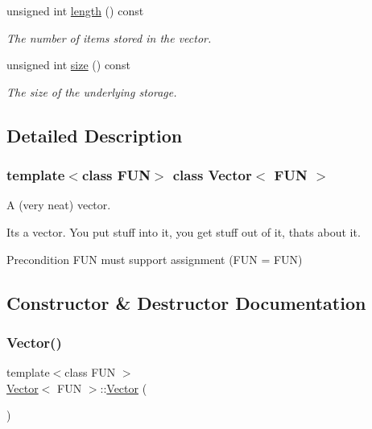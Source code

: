 \begin{DoxyCompactItemize}
unsigned int \hyperlink{classVector_ab89f11fa1d0aadc25484f4971f16f38a}{length} () const
\begin{DoxyCompactList}\small\item\em The number of items stored in the vector. \end{DoxyCompactList}\item 
unsigned int \hyperlink{classVector_a21b80c989eadd6dfa49f2c01e53abd35}{size} () const
\begin{DoxyCompactList}\small\item\em The size of the underlying storage. \end{DoxyCompactList}\end{DoxyCompactItemize}


\subsection{Detailed Description}
\subsubsection*{template$<$class F\+UN$>$\newline
class Vector$<$ F\+U\+N $>$}

A (very neat) vector. 

It\textquotesingle{}s a vector. You put stuff into it, you get stuff out of it, that\textquotesingle{}s about it.

\begin{DoxyPrecond}{Precondition}
F\+UN must support assignment (F\+UN = F\+UN) 
\end{DoxyPrecond}


\subsection{Constructor \& Destructor Documentation}
\mbox{\label{classVector_a194c6782f240165dc863402fe4749146}} 
\subsubsection{\texorpdfstring{Vector()}{Vector()}\hspace{0.1cm}{\footnotesize\ttfamily [1/2]}}
{\footnotesize\ttfamily template$<$class F\+UN $>$ \\
\hyperlink{classVector}{Vector}$<$ F\+UN $>$\+::\hyperlink{classVector}{Vector} (\begin{DoxyParamCaption}{ }\end{DoxyParamCaption})}



